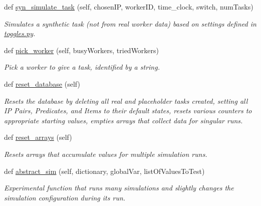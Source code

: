 \begin{DoxyCompactItemize}
def \mbox{\hyperlink{classdynamicfilterapp_1_1test__simulations_1_1_simulation_test_a652b503c9374430264cac65df6c59eee}{syn\+\_\+simulate\+\_\+task}} (self, chosen\+IP, worker\+ID, time\+\_\+clock, switch, num\+Tasks)
\begin{DoxyCompactList}\small\item\em Simulates a synthetic task (not from real worker data) based on settings defined in \mbox{\hyperlink{toggles_8py}{toggles.\+py}}. \end{DoxyCompactList}\item 
def \mbox{\hyperlink{classdynamicfilterapp_1_1test__simulations_1_1_simulation_test_acb17139f8e2f7a4b835ec1c05400e8c2}{pick\+\_\+worker}} (self, busy\+Workers, tried\+Workers)
\begin{DoxyCompactList}\small\item\em Pick a worker to give a task, identified by a string. \end{DoxyCompactList}\item 
def \mbox{\hyperlink{classdynamicfilterapp_1_1test__simulations_1_1_simulation_test_a5af6b7d43daa54fef6fc6580683e5c80}{reset\+\_\+database}} (self)
\begin{DoxyCompactList}\small\item\em Resets the database by deleting all real and placeholder tasks created, setting all IP Pairs, Predicates, and Items to their default states, resets various counters to appropriate starting values, empties arrays that collect data for singular runs. \end{DoxyCompactList}\item 
def \mbox{\hyperlink{classdynamicfilterapp_1_1test__simulations_1_1_simulation_test_a7226eb6e9e46f40e7b99f22aade32edf}{reset\+\_\+arrays}} (self)
\begin{DoxyCompactList}\small\item\em Resets arrays that accumulate values for multiple simulation runs. \end{DoxyCompactList}\item 
def \mbox{\hyperlink{classdynamicfilterapp_1_1test__simulations_1_1_simulation_test_a9c135691a7d3f7baca5225dd869bb073}{abstract\+\_\+sim}} (self, dictionary, global\+Var, list\+Of\+Values\+To\+Test)
\begin{DoxyCompactList}\small\item\em Experimental function that runs many simulations and slightly changes the simulation configuration during its run. \end{DoxyCompactList}\item 

\end{DoxyCompactItemize}
